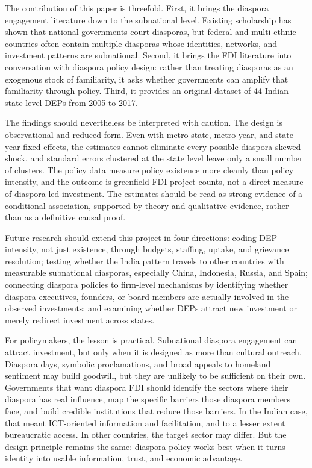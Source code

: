 \documentclass[12pt]{article}
\begin{document}
The contribution of this paper is threefold. First, it brings the diaspora engagement literature down to the subnational level. Existing scholarship has shown that national governments court diasporas, but federal and multi-ethnic countries often contain multiple diasporas whose identities, networks, and investment patterns are subnational. Second, it brings the FDI literature into conversation with diaspora policy design: rather than treating diasporas as an exogenous stock of familiarity, it asks whether governments can amplify that familiarity through policy. Third, it provides an original dataset of 44 Indian state-level DEPs from 2005 to 2017.

The findings should nevertheless be interpreted with caution. The design is observational and reduced-form. Even with metro-state, metro-year, and state-year fixed effects, the estimates cannot eliminate every possible diaspora-skewed shock, and standard errors clustered at the state level leave only a small number of clusters. The policy data measure policy existence more cleanly than policy intensity, and the outcome is greenfield FDI project counts, not a direct measure of diaspora-led investment. The estimates should be read as strong evidence of a conditional association, supported by theory and qualitative evidence, rather than as a definitive causal proof.

Future research should extend this project in four directions: coding DEP intensity, not just existence, through budgets, staffing, uptake, and grievance resolution; testing whether the India pattern travels to other countries with measurable subnational diasporas, especially China, Indonesia, Russia, and Spain; connecting diaspora policies to firm-level mechanisms by identifying whether diaspora executives, founders, or board members are actually involved in the observed investments; and examining whether DEPs attract new investment or merely redirect investment across states.

For policymakers, the lesson is practical. Subnational diaspora engagement can attract investment, but only when it is designed as more than cultural outreach. Diaspora days, symbolic proclamations, and broad appeals to homeland sentiment may build goodwill, but they are unlikely to be sufficient on their own. Governments that want diaspora FDI should identify the sectors where their diaspora has real influence, map the specific barriers those diaspora members face, and build credible institutions that reduce those barriers. In the Indian case, that meant ICT-oriented information and facilitation, and to a lesser extent bureaucratic access. In other countries, the target sector may differ. But the design principle remains the same: diaspora policy works best when it turns identity into usable information, trust, and economic advantage.
\end{document}
